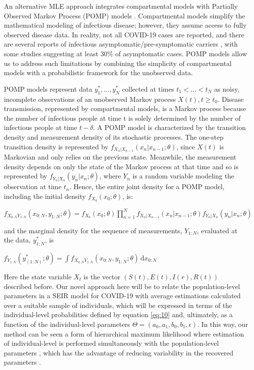 \documentclass{article}
\begin{document}
An alternative MLE approach integrates compartmental models with Partially Observed Markov Process (POMP) models \cite{king2016}. Compartmental models simplify the mathematical modeling of infectious disease; however, they assume access to fully observed disease data. In reality, not all COVID-19 cases are reported, and there are several reports of infectious asymptomatic/pre-symptomatic carriers \cite{Aguirre-Duarte2020}, with some studies \cite{Nishiura2020} suggesting at least 30\% of asymptomatic cases. POMP models allow us to address such limitations by combining the simplicity of compartmental models with a probabilistic framework for the unobserved data. 

POMP models represent data $y_1^*,...,y_N^*$ collected at times $t_1<...<t_N$ as noisy, incomplete observations of an unobserved Markov process ${X(t),t \geq t_0}$. Disease transmission, represented by compartmental models, is a Markov process because the number of infectious people at time t is solely determined by the number of infectious people at time $t-\delta$. A POMP model is characterized by the transition density and measurement density of its stochastic processes. The one-step transition density is represented by $f_{X_n |X_{n-1}}(x_n | x_{n-1};\theta)$, since ${X(t)}$ is Markovian and only relies on the previous state. Meanwhile, the measurement density depends on only the state of the Markov process at that time and so is represented by $f_{Y_n |X_n}(y_n | x_n;\theta)$, where $Y_n$ is a random variable modeling the observation at time $t_n$. Hence, the entire joint density for a POMP model, including the initial density $f_{X_0}(x_0;\theta)$, is:

\begin{center}
$f_{X_{0:N}Y_{1:N}}(x_{0:N},y_{1:N};\theta)=f_{X_0}(x_0;\theta) \prod\limits_{n=1}^{N} f_{X_n |X_{n-1}}(x_n | x_{n-1};\theta)f_{Y_n |X_n}(y_n | x_n;\theta)$
\end{center}

and the marginal density for the sequence of measurements, $Y_{1:N}$, evaluated at the data, $y_{1:N}^*$, is

\begin{center}
$f_{Y_{1:N}}(y_(1:N)^*;\theta)=\int \! f_{X_{0:N}Y_{1:N}}(x_{0:N},y_{1:N};\theta) \, \mathrm{d}x_{0:N}$
\end{center}

Here the state variable $X_t$ is the vector $(S(t), E(t), I(r), R(t))$ described before. Our novel approach here will be to relate the population-level parameters in a SEIR model for COVID-19 \cite{Wang2020} with average estimations calculated over a suitable sample of individuals, which will be expressed in terms of the individual-level probabilities defined by equation \eqref{eq:10} and, ultimately, as a function of the individual-level parameters $\Theta=(a_0, a_1, b_0, b_1, \epsilon)$. In this way, our method can be seen a form of hierarchical maximum likelihood where estimation of individual-level is performed simultaneously with the population-level parameters \cite{Rouder2005}, which has the advantage of reducing variability in the recovered parameters \cite{Farrell2008}.
\end{document}
